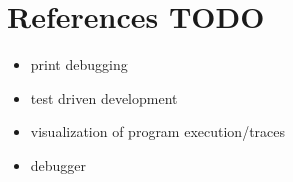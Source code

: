\section{References TODO}

\begin{itemize}
	\item print debugging
	\item test driven development
	\item visualization of program execution/traces
	\item debugger
\end{itemize}
